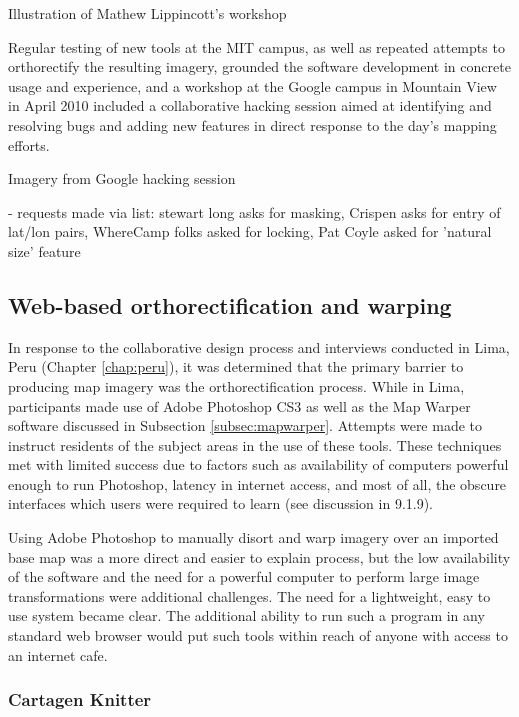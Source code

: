 \documentclass[11pt]{report}
\begin{document}
Illustration of Mathew Lippincott's workshop 

Regular testing of new tools at the MIT campus, as well as repeated attempts to orthorectify the resulting imagery, grounded the software development in concrete usage and experience, and a workshop at the Google campus in Mountain View in April 2010 included a collaborative hacking session aimed at identifying and resolving bugs and adding new features in direct response to the day's mapping efforts. 

Imagery from Google hacking session

 - requests made via list: stewart long asks for masking, Crispen asks for entry of lat/lon pairs, WhereCamp folks asked for locking, Pat Coyle asked for 'natural size' feature

\subsection{Web-based orthorectification and warping}

In response to the collaborative design process and interviews conducted in Lima, Peru (Chapter \ref{chap:peru}), it was determined that the primary barrier to producing map imagery was the orthorectification process. While in Lima, participants made use of Adobe Photoshop CS3 as well as the Map Warper software discussed in Subsection \ref{subsec:mapwarper}. Attempts were made to instruct residents of the subject areas in the use of these tools. These techniques met with limited success due to factors such as availability of computers powerful enough to run Photoshop, latency in internet access, and most of all, the obscure interfaces which users were required to learn (see discussion in 9.1.9).  

Using Adobe Photoshop to manually disort and warp imagery over an imported base map was a more direct and easier to explain process, but the low availability of the software and the need for a powerful computer to perform large image transformations were additional challenges. The need for a lightweight, easy to use system became clear. The additional ability to run such a program in any standard web browser would put such tools within reach of anyone with access to an internet cafe.

\subsubsection{Cartagen Knitter}
\label{subsubsec:knitter}
\end{document}
